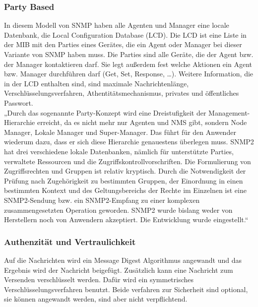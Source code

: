 \documentclass[11pt,a4paper]{article}
\begin{document}
\subsubsection{Party Based}
In diesem Modell von SNMP haben alle Agenten und Manager eine locale Datenbank, die Local Configuration Database (LCD). Die LCD ist eine Liste in der MIB mit den Parties eines Gerätes, die ein Agent oder Manager bei dieser Variante von SNMP haben muss. Die Parties sind alle Geräte, die der Agent bzw. der Manager kontaktieren darf. Sie legt außerdem fest welche Aktionen ein Agent bzw. Manager durchführen darf (Get, Set, Response, …). Weitere Information, die in der LCD enthalten sind, sind maximale Nachrichtenlänge, Verschlüsselungsverfahren, Athentitätsmechanismus, privates und öffentliches Passwort.\\
„Durch das sogenannte Party-Konzept wird eine Dreistufigkeit der Management-Hierarchie erreicht, da es nicht mehr nur Agenten und NMS gibt, sondern Node Manager, Lokale Manager und Super-Manager. Das führt für den Anwender wiederum dazu, dass er sich diese Hierarchie genauestens überlegen muss. SNMP2 hat drei verschiedene lokale Datenbanken, nämlich für unterstützte Parties, verwaltete Ressourcen und die Zugriffskontrollvorschriften. Die Formulierung von Zugriffsrechten und Gruppen ist relativ kryptisch. Durch die Notwendigkeit der Prüfung nach Zugehörigkeit zu bestimmten Gruppen, der Einordnung in einen bestimmten Kontext und des Geltungsbereichs der Rechte im Einzelnen ist eine SNMP2-Sendung bzw. ein SNMP2-Empfang zu einer komplexen zusammengesetzten Operation geworden. SNMP2 wurde bislang weder von Herstellern noch von Anwendern akzeptiert. Die Entwicklung wurde eingestellt.“
\cite{snmpv2PartyBased}\\

\subsubsection{Authenzität und Vertraulichkeit}
Auf die Nachrichten wird ein Message Digest Algorithmus angewandt und das Ergebnis wird der Nachricht beigefügt. Zusätzlich kann eine Nachricht zum Versenden verschlüsselt werden. Dafür wird ein symmetrisches Verschlüsselungsverfahren benutzt. Beide verfahren zur Sicherheit sind optional, sie können angewandt werden, sind aber nicht verpflichtend.\\
\end{document}
